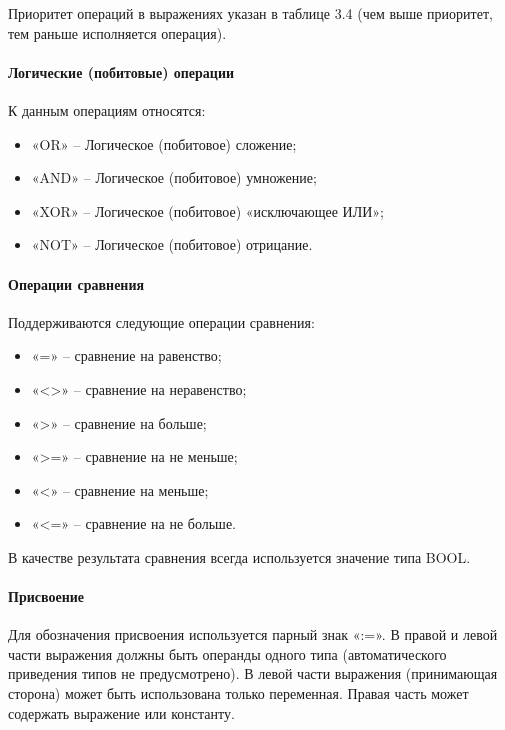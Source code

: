 \documentclass[letterpaper,10pt,russian]{sphinxmanual}
\begin{document}
Приоритет операций в выражениях указан в таблице 3.4 (чем выше
приоритет, тем раньше исполняется операция).


\paragraph{Логические (побитовые) операции}
\label{iec_guide/st_guide:id5}
К данным операциям относятся:
\begin{itemize}
\item {} 
«OR» – Логическое (побитовое) сложение;

\item {} 
«AND» – Логическое (побитовое) умножение;

\item {} 
«XOR» – Логическое (побитовое) «исключающее ИЛИ»;

\item {} 
«NOT» – Логическое (побитовое) отрицание.

\end{itemize}


\paragraph{Операции сравнения}
\label{iec_guide/st_guide:id6}
Поддерживаются следующие операции сравнения:
\begin{itemize}
\item {} 
«=» – сравнение на равенство;

\item {} 
«\textless{}\textgreater{}» – сравнение на неравенство;

\item {} 
«\textgreater{}» – сравнение на больше;

\item {} 
«\textgreater{}=» – сравнение на не меньше;

\item {} 
«\textless{}» – сравнение на меньше;

\item {} 
«\textless{}=» – сравнение на не больше.

\end{itemize}

В качестве результата сравнения всегда используется значение типа BOOL.


\paragraph{Присвоение}
\label{iec_guide/st_guide:id7}
Для обозначения присвоения используется парный знак «:=». В правой и
левой части выражения должны быть операнды одного типа (автоматического
приведения типов не предусмотрено). В левой части выражения (принимающая
сторона) может быть использована только переменная. Правая часть может
содержать выражение или константу.
\end{document}
